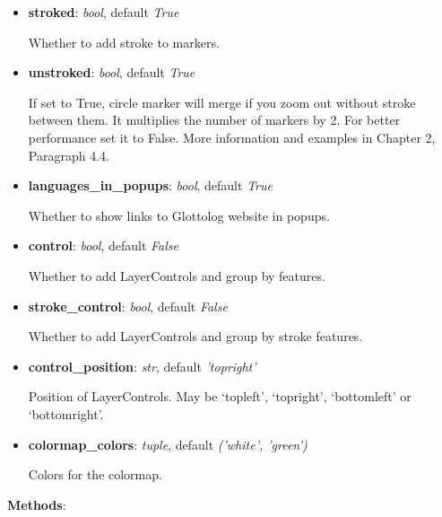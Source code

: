 \documentclass[a4paper,12pt]{article}
\begin{document}
\begin{itemize}
 \item \textbf{stroked}: \textit{bool}, default \textit{True}
 
 Whether to add stroke to markers.

 \item \textbf{unstroked}: \textit{bool}, default \textit{True}
 
 If set to True, circle marker will merge if you zoom out without stroke between them. It multiplies the number of markers by 2. For better performance set it to False. More information and examples in Chapter 2, Paragraph 4.4.
 
 \item \textbf{languages\_in\_popups}: \textit{bool}, default \textit{True}
 
 Whether to show links to Glottolog website in popups.
 
 \item \textbf{control}: \textit{bool}, default \textit{False}
 
 Whether to add LayerControls and group by features.

 \item \textbf{stroke\_control}: \textit{bool}, default \textit{False}
 
 Whether to add LayerControls and group by stroke features.
 
 \item \textbf{control\_position}: \textit{str}, default \textit{'topright'}
 
 Position of LayerControls. May be ‘topleft’, ‘topright’, ‘bottomleft’ or ‘bottomright’.

 \item \textbf{colormap\_colors}: \textit{tuple}, default \textit{('white', 'green')}
 
 Colors for the colormap.

\end{itemize}

\textbf{Methods}:
\end{document}
